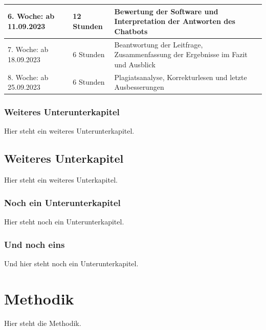 \documentclass[11pt]{article}
\begin{document}
\begin{tabularx}{\columnwidth}{p{2.75cm}lX}
  6. Woche:     \newline ab 11.09.2023  & 12 Stunden      & Bewertung der Software und Interpretation der Antworten des Chatbots                \\ \midrule

  7. Woche:     \newline ab 18.09.2023  & 6 Stunden       & Beantwortung der Leitfrage, Zusammenfassung der Ergebnisse im Fazit und Ausblick    \\ \midrule

  8. Woche:     \newline ab 25.09.2023  & 6 Stunden       & Plagiatsanalyse, Korrekturlesen und letzte Ausbesserungen
\end{tabularx}

\subsubsection{Weiteres Unterunterkapitel}
\label{subsubsec:weiteres-unterunterkapitel}

Hier steht ein weiteres Unterunterkapitel.

\subsection{Weiteres Unterkapitel}
\label{subsec:weiteres-unterkapitel}

Hier steht ein weiteres Unterkapitel.

\subsubsection{Noch ein Unterunterkapitel}
\label{subsubsec:noch-ein-unterunterkapitel}

Hier steht noch ein Unterunterkapitel.

\subsubsection{Und noch eins}
\label{subsubsec:und-noch-eins}

Und hier steht noch ein Unterunterkapitel.

\clearpage

\section{Methodik}
\label{sec:methodik}

Hier steht die Methodik.
\end{document}
